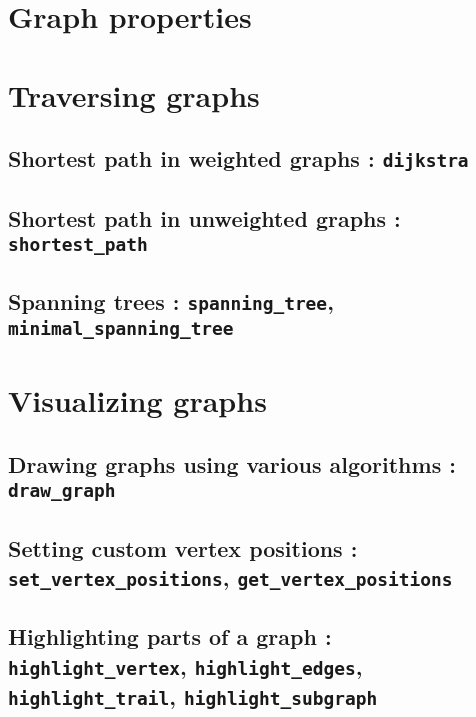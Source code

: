 \documentclass[a4paper,11pt]{article}
\begin{document}
\section{Graph properties}

\section{Traversing graphs}

\subsection{Shortest path in weighted graphs : {\tt dijkstra}}

\subsection{Shortest path in unweighted graphs : {\tt shortest\_path}}

\subsection{Spanning trees : {\tt spanning\_tree}, {\tt minimal\_spanning\_tree}}

\section{Visualizing graphs}

\subsection{Drawing graphs using various algorithms : {\tt draw\_graph}}

\subsection{Setting custom vertex positions : {\tt set\_vertex\_positions}, {\tt get\_vertex\_positions}}

\subsection{Highlighting parts of a graph : {\tt highlight\_vertex}, {\tt highlight\_edges}, {\tt highlight\_trail}, {\tt highlight\_subgraph}}
\end{document}
